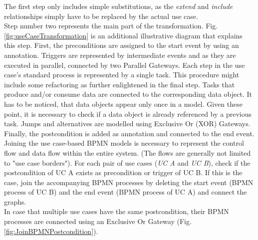 \noindent
The first step only includes simple substitutions, as the \textit{extend} and \textit{include} relationships simply have to be replaced by the actual use case.\\
Step number two represents the main part of the transformation. Fig.\ref{fig:useCaseTransformation} is an additional illustrative diagram that explains this step. First, the preconditions are assigned to the start event by using an annotation. Triggers are represented by intermediate events and as they are executed in parallel, connected by two Parallel Gateways. Each step in the use case's standard process is represented by a single task. This procedure might include some refactoring as further enlightened in the final step. Tasks that produce and/or consume data are connected to the corresponding data object. It has to be noticed, that data objects appear only once in a model. Given these point, it is necessary to check if a data object is already referenced by a previous task. Jumps and alternatives are modelled using Exclusive Or (XOR) Gateways. Finally, the postcondition is added as annotation and connected to the end event. \\
Joining the use case-based BPMN models is necessary to represent the control flow and data flow within the entire system. (The flows are generally not limited to "use case borders"). For each pair of use cases (\textit{UC A} and \textit{UC B}), check if the postcondition of UC A exists as precondition or trigger of UC B. If this is the case, join the accompanying BPMN processes by deleting the start event (BPMN process of UC B) and the end event (BPMN process of UC A) and connect the graphs. \\
In case that multiple use cases have the same postcondition, their BPMN processes are connected using an Exclusive Or Gateway (Fig.\ref{fig:JoinBPMNPostcondition}). 

